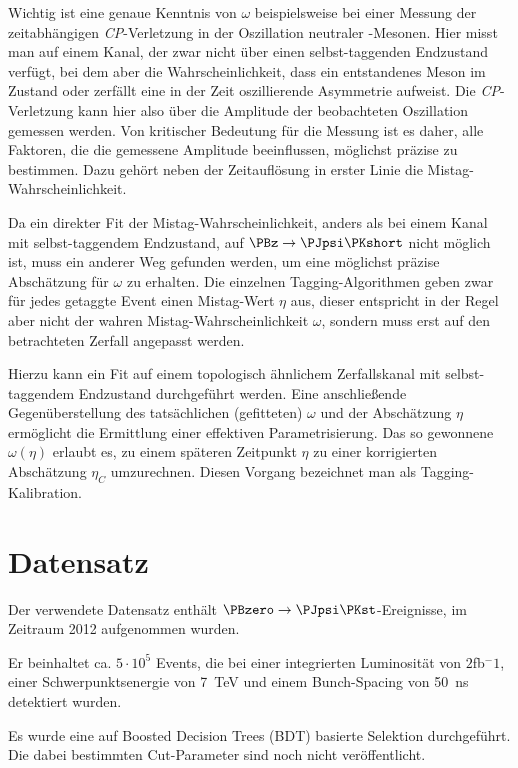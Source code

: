 Wichtig ist eine genaue Kenntnis von $ω$ beispielsweise bei einer Messung der zeitabhängigen \textit{CP}-Verletzung in der Oszillation neutraler \PB-Mesonen.
Hier misst man auf einem Kanal, der zwar nicht über einen selbst-taggenden Endzustand verfügt, bei dem aber die Wahrscheinlichkeit, dass ein entstandenes Meson im Zustand \PBz oder \PaBz zerfällt eine in der Zeit oszillierende Asymmetrie aufweist.
Die \textit{CP}-Verletzung kann hier also über die Amplitude der beobachteten Oszillation gemessen werden.
Von kritischer Bedeutung für die Messung ist es daher, alle Faktoren, die die gemessene Amplitude beeinflussen, möglichst präzise zu bestimmen.
Dazu gehört neben der Zeitauflösung in erster Linie die Mistag-Wahrscheinlichkeit.

Da ein direkter Fit der Mistag-Wahrscheinlichkeit, anders als bei einem Kanal mit selbst-taggendem Endzustand, auf $\PBz\to\PJpsi\PKshort$ nicht möglich ist, muss ein anderer Weg gefunden werden, um eine möglichst präzise Abschätzung für $ω$ zu erhalten.
Die einzelnen Tagging-Algorithmen geben zwar für jedes getaggte Event einen Mistag-Wert $η$ aus, dieser entspricht in der Regel aber nicht der wahren Mistag-Wahrscheinlichkeit $ω$, sondern muss erst auf den betrachteten Zerfall angepasst werden.

Hierzu kann ein Fit auf einem topologisch ähnlichem Zerfallskanal mit selbst-taggendem Endzustand durchgeführt werden.
Eine anschließende Gegenüberstellung des tatsächlichen (gefitteten) $ω$ und der Abschätzung $η$ ermöglicht die Ermittlung einer effektiven Parametrisierung.
Das so gewonnene $ω(η)$ erlaubt es, zu einem späteren Zeitpunkt $η$ zu einer korrigierten Abschätzung $η_C$ umzurechnen.
Diesen Vorgang bezeichnet man als Tagging-Kalibration.

\section{Datensatz}
\label{datensatz}

Der verwendete Datensatz enthält $\PBzero \to \PJpsi\PKst$-Ereignisse, im Zeitraum 2012 aufgenommen wurden.

Er beinhaltet ca. $5\cdot10^5$ Events, die bei einer integrierten Luminosität von $2$\:fb$^-1$, einer Schwerpunktsenergie von \SI{7}{\tera\electronvolt} und einem Bunch-Spacing von \SI{50}{\nano\second} detektiert wurden.

Es wurde eine auf Boosted Decision Trees (BDT) basierte Selektion durchgeführt.
Die dabei bestimmten Cut-Parameter sind noch nicht veröffentlicht.

